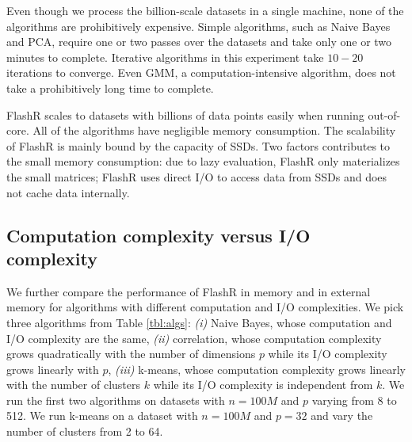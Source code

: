 Even though we process the billion-scale datasets in a single machine, none of
the algorithms are prohibitively expensive. Simple algorithms, such as
Naive Bayes and PCA, require one or two passes over the datasets and take
only one or two minutes to complete. Iterative algorithms in this experiment
take $10-20$ iterations to converge.
Even GMM, a computation-intensive algorithm, does not take
a prohibitively long time to complete.

FlashR scales to datasets with billions of data points easily when running
out-of-core. All of the algorithms have negligible memory consumption.
The scalability of FlashR is mainly bound by the capacity of SSDs.
Two factors contributes to the small memory consumption: due to lazy evaluation,
FlashR only materializes the small matrices; FlashR uses direct I/O to access
data from SSDs and does not cache data internally.

\subsection{Computation complexity versus I/O complexity}
We further compare the performance of FlashR in memory and in external memory
for algorithms with different computation and I/O complexities.
We pick three algorithms from Table \ref{tbl:algs}: \textit{(i)} Naive Bayes,
whose computation and I/O complexity are the same, \textit{(ii)}
correlation, whose computation complexity grows quadratically with the number
of dimensions $p$ while
its I/O complexity grows linearly with $p$, \textit{(iii)} k-means, whose computation
complexity grows linearly with the number of clusters $k$ while its I/O
complexity is independent
from $k$. We run the first two algorithms on datasets with $n=100M$ and $p$
varying from 8 to 512. We run k-means on a dataset with $n=100M$ and $p=32$
and vary the number of clusters from 2 to 64.

